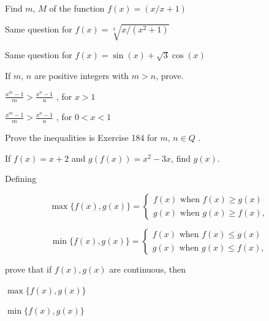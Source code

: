 \documentclass[11pt]{amsbook}
\begin{document}
    \begin{hEnumerateArabic}
    
        \setcounter{enumi}{180}
        \item {Find $m$, $M$ of the function $f(x) = ( {x} / {x+1} )$} 
        
        \item{Same question for $f(x) = \sqrt[3]{ {x} / ({x^2+1})}$}
        
        \item{Same question for $f(x) = \sin({x}) + \sqrt{3} \cos({x})$}
        
        
        \item{If $m$, $n$ are positive integers with $m > n$, prove. }
        
            \begin{hEnumerateAlpha}
                \item $\frac{x^m - 1}{m} > \frac{x^n - 1}{n}$ , for $x > 1$
                \item $\frac{x^m - 1}{m} > \frac{x^n - 1}{n}$ , for $0 < x < 1$
            \end{hEnumerateAlpha}
        
        \item{Prove the inequalities is Exercise 184 for $m$, $n\in Q$ .}
        \item{If $f(x) = x + 2$ and $g(f(x)) = x^2 - 3x$, find $g(x)$. }
        \item{Defining }
        
        \[
            \max{\{ f(x), g(x) \}} =\begin{cases}
                                        f(x) \text { when } f(x) \ge g(x)\\
                                        g(x) \text { when } g(x) \ge f(x),
                                    \end{cases}
        \]
        
        \[
            \min{\{ f(x), g(x) \}} =\begin{cases}
                                        f(x) \text { when } f(x) \le g(x)\\
                                        g(x) \text { when } g(x) \le f(x),
                                    \end{cases}
        \]
        
        \noindent
        prove that if $f(x), g(x)$ are continuous, then 
        
            \begin{hEnumerateAlpha}
                \begin{multicols}{2}
                    \item $\max{\{ f(x), g(x) \}}$
                \columnbreak
                    \item $\min{\{ f(x), g(x) \}}$
                \end{multicols}
            \end{hEnumerateAlpha}


\end{hEnumerateArabic}
\end{document}
